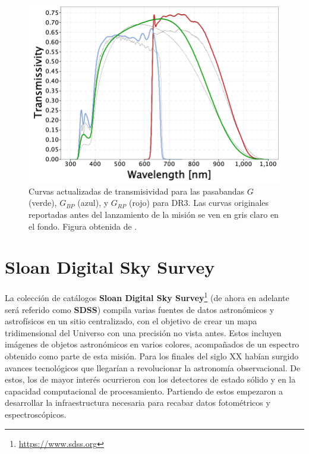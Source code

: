 \begin{figure}[!ht]
    \centering
    \includegraphics[scale=0.4]{Muestra/Secciones/Figures/Figura Gaia Pasabandas DR3.png}
    \caption{Curvas actualizadas de transmisividad para las pasabandas $G$
    (verde), $G_{BP}$ (azul), y $G_{RP}$ (rojo) para DR3. Las curvas originales
    reportadas antes del lanzamiento de la misión se ven en gris claro en el
    fondo. Figura obtenida de
    .}
    \label{figuraGaiaPasabandasDr3}
\end{figure}

\section{Sloan Digital Sky Survey}

La colección de catálogos \textbf{Sloan Digital Sky
Survey}\footnote{\url{https://www.sdss.org}} (de ahora en adelante será referido
como \textbf{SDSS}) compila varias fuentes de datos astronómicos y astrofísicos
en un sitio centralizado, con el objetivo de crear un mapa tridimensional del
Universo con una precisión no vista antes. Estos incluyen imágenes de objetos
astronómicos en varios colores, acompañados de un espectro obtenido como parte
de esta misión. Para los finales del siglo XX habían surgido avances
tecnológicos que llegarían a revolucionar la astronomía observacional. De estos,
los de mayor interés ocurrieron con los detectores de estado sólido y en la
capacidad computacional de procesamiento. Partiendo de estos empezaron a
desarrollar la infraestructura necesaria para recabar datos fotométricos y
espectroscópicos.


